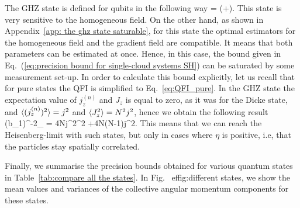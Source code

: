 The GHZ state is defined for qubits in the following way
\be
\label{eq:definition of ghz}
 = (+).
\ee
This state is very sensitive to the homogeneous field.
On the other hand, as shown in Appendix~\ref{app: the ghz state saturable}, for this state the optimal estimators for the homogeneous field and the gradient field are compatible.
It means that both parameters can be estimated at once.
Hence, in this case, the bound given in Eq.~(\ref{eq:precision bound for single-cloud systems SH}) can be saturated by some measurement set-up.
In order to calculate this bound explicitly, let us recall that for pure states the QFI is simplified to Eq.~\eqref{eq:QFI_pure}.
In the GHZ state the expectation value of $j_z^{(n)}$ and
$J_z$ is equal to zero, as it was for the Dicke state, and $\langle (j_z^{(n)})^2 \rangle=j^2$ and $\langle J_z^2 \rangle
= N^2j^2$, hence we obtain the following result
\be
\label{eq:precision bound for ghz}
(\Delta b_1)^{-2}_{\max} = 4Nj^2\sigma^2 +4N(N-1)j^2\eta.
\ee
This means that we can reach the Heisenberg-limit with such states, but only in
cases where $\eta$ is positive, i.e, that the particles stay spatially correlated.


Finally, we summarise the precision bounds obtained for various quantum states in Table~\ref{tab:compare all the states}.
In Fig.~
ef{fig:different states}, we show the mean values and variances
of the collective angular momentum components for these states.

